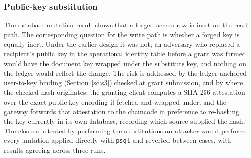 \documentclass[preprint,12pt]{elsarticle}
\begin{document}
\subsubsection{Public-key substitution}
\label{sec:exp_pubkey}

The database-mutation result shows that a forged access row is inert on the
read path. The corresponding question for the write path is whether a forged
key is equally inert. Under the earlier design it was not; an adversary who
replaced a recipient's public key in the operational identity table before a
grant was formed would have the document key wrapped under the substitute key,
and nothing on the ledger would reflect the change. The risk is addressed by
the ledger-anchored user-to-key binding (Section~\ref{sc:s3}) checked at
grant submission, and by where the checked hash originates: the granting
client computes a SHA-256 attestation over the exact public-key encoding it
fetched and wrapped under, and the gateway forwards that attestation to the
chaincode in preference to re-hashing the key currently in its own database,
recording which source supplied the hash. The closure is tested by performing
the substitutions an attacker would perform, every mutation applied directly
with \texttt{psql} and reverted between cases, with results agreeing across
three runs.
\end{document}
